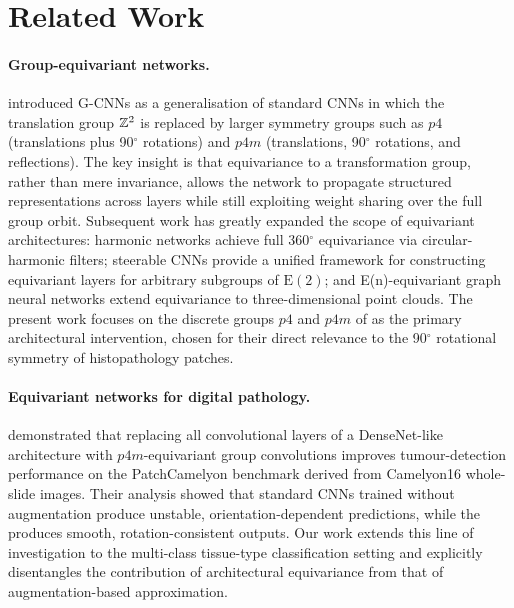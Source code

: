 \section{Related Work}
\label{sec:related_work}

\paragraph{Group-equivariant networks.}
\citet{cohen2016group} introduced G-CNNs as a generalisation of standard CNNs in which
the translation group \(\mathbb{Z}^2\) is replaced by larger symmetry groups such as \(p4\) (translations
plus 90\(^\circ\) rotations) and \(p4m\) (translations, 90\(^\circ\) rotations, and reflections). The key
insight is that equivariance to a transformation group, rather than mere invariance, allows
the network to propagate structured representations across layers while still exploiting
weight sharing over the full group orbit. Subsequent work has greatly expanded the scope
of equivariant architectures: harmonic networks \citep{worrall2017harmonic} achieve full
360\(^\circ\) equivariance via circular-harmonic filters; steerable CNNs
\citep{weiler2019general} provide a unified framework for constructing equivariant layers
for arbitrary subgroups of \(\mathrm{E}(2)\); and E(n)-equivariant graph neural networks
\citep{satorras2021egnn} extend equivariance to three-dimensional point clouds. The present
work focuses on the discrete groups \(p4\) and \(p4m\) of \citet{cohen2016group} as the primary
architectural intervention, chosen for their direct relevance to the 90\(^\circ\) rotational
symmetry of histopathology patches.

\paragraph{Equivariant networks for digital pathology.}
\citet{veeling2018rotation} demonstrated that replacing all convolutional layers of a
DenseNet-like architecture with \(p4m\)-equivariant group convolutions improves
tumour-detection performance on the PatchCamelyon benchmark derived from Camelyon16
whole-slide images. Their analysis showed that standard CNNs trained without augmentation
produce unstable, orientation-dependent predictions, while the \gcnn{} produces smooth,
rotation-consistent outputs. Our work extends this line of investigation to the
multi-class tissue-type classification setting and explicitly disentangles the contribution
of architectural equivariance from that of augmentation-based approximation.

